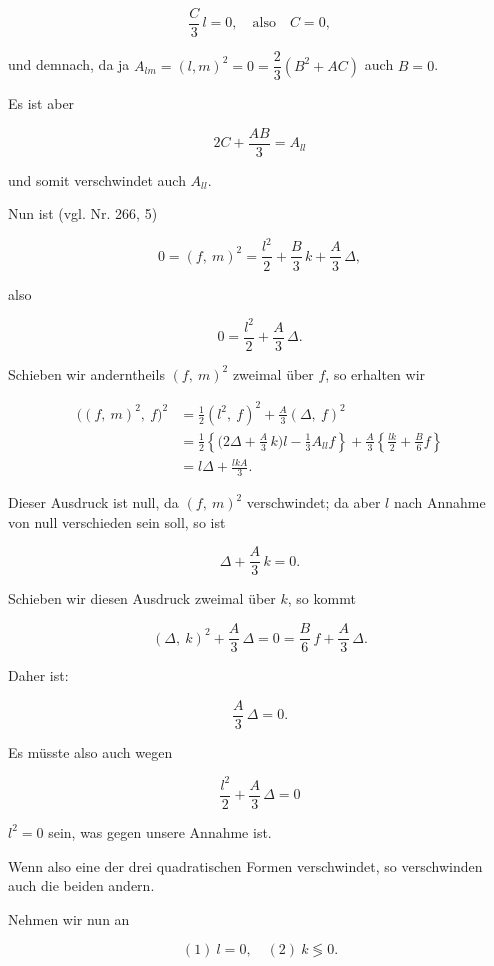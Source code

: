 \[ \frac{C}{3}\, l = 0,\quad \text{also}\quad C=0, \]

und demnach, da ja $A_{lm}=(l,m)^2=0=\dfrac{2}{3}(B^2+AC)$ auch $B=0$.



Es ist aber

\[ 2C + \frac{AB}{3} = A_{ll} \]

und somit verschwindet auch $A_{ll}$.

Nun ist (vgl. Nr. 266, 5)

\[ 0 = (f,\ m)^2 = \frac{l^2}{2} + \frac{B}{3}\, k + \frac{A}{3}\, \varDelta, \]

also

\[ 0 = \frac{l^2}{2} + \frac{A}{3}\, \varDelta. \]

Schieben wir anderntheils $(f,\ m)^2$ zweimal über $f$, so erhalten wir %

\begin{align*}
\big((f,\ m)^2,\ f\big)^2 &= \frac{1}{2}(l^2,\ f)^2 + \frac{A}{3}(\varDelta,\ f)^2\\
&= \frac{1}{2}\left\{\Big(2\varDelta + \frac{A}{3}\, k\Big) l - \frac{1}{3} A_{ll} f\right\} + \frac{A}{3}\left\{\frac{lk}{2} + \frac{B}{6} f\right\}\\
&= l\varDelta + \frac{lkA}{3}.
\end{align*}

Dieser Ausdruck ist null, da $(f,\ m)^2$ verschwindet; da aber $l$ nach Annahme von null verschieden sein soll, so ist

\[ \varDelta + \frac{A}{3}\, k = 0. \]

Schieben wir diesen Ausdruck zweimal über $k$, so kommt

\[ (\varDelta,\ k)^2 + \frac{A}{3}\, \varDelta = 0 = \frac{B}{6}\, f + \frac{A}{3}\, \varDelta. \]

Daher ist:

\[ \frac{A}{3}\, \varDelta = 0. \]

Es müsste also auch wegen

\[ \frac{l^2}{2} + \frac{A}{3}\, \varDelta = 0 \]

$l^2=0$ sein, was gegen unsere Annahme ist.

Wenn also eine der drei quadratischen Formen verschwindet, so verschwinden auch die beiden andern.

Nehmen wir nun an

\[ (1)\ l=0,\quad (2)\ k \lessgtr 0. \]

